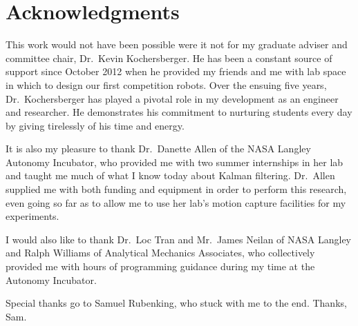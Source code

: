 \chapter*{Acknowledgments}

This work would not have been possible were it not for my graduate adviser and committee chair, Dr.~Kevin Kochersberger. He has been a constant source of support since October 2012 when he provided my friends and me with lab space in which to design our first competition robots. Over the ensuing five years, Dr.~Kochersberger has played a pivotal role in my development as an engineer and researcher. He demonstrates his commitment to nurturing students every day by giving tirelessly of his time and energy.

It is also my pleasure to thank Dr.~Danette Allen of the NASA Langley Autonomy Incubator, who provided me with two summer internships in her lab and taught me much of what I know today about Kalman filtering. Dr.~Allen supplied me with both funding and equipment in order to perform this research, even going so far as to allow me to use her lab's motion capture facilities for my experiments.

I would also like to thank Dr.~Loc Tran and Mr.~James Neilan of NASA Langley and Ralph Williams of Analytical Mechanics Associates, who collectively provided me with hours of programming guidance during my time at the Autonomy Incubator.

Special thanks go to Samuel Rubenking, who stuck with me to the end. Thanks, Sam.
